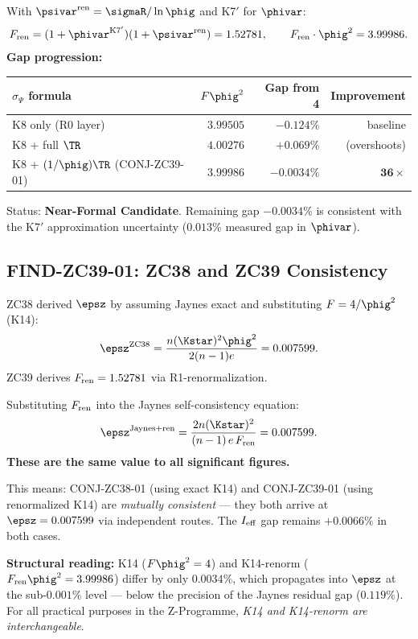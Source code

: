\documentclass[12pt, a4paper]{article}
\begin{document}
\begin{keybox}[title={K14 Near-Formal: $F\phig^2 = 3.99986$ (gap $-0.0034\%$)}]
With $\psivar^{\rm ren} = \sigmaR/\ln\phig$ and K7$'$ for $\phivar$:
\[
  F_{\rm ren} = (1+\phivar^{\rm K7'})(1+\psivar^{\rm ren})
  = 1.52781,
  \qquad
  F_{\rm ren}\cdot\phig^2 = 3.99986.
\]
\textbf{Gap progression:}
\begin{center}
\renewcommand{\arraystretch}{1.3}
\begin{tabular}{lrrr}
\toprule
$\sigma_\Psi$ formula & $F\phig^2$ & Gap from 4 & Improvement \\
\midrule
K8 only (R0 layer)       & $3.99505$ & $-0.124\%$ & baseline \\
K8 + full $\TR$          & $4.00276$ & $+0.069\%$ & (overshoots) \\
K8 + $(1/\phig)\TR$ (CONJ-ZC39-01) & $3.99986$ & $-0.0034\%$ & $\mathbf{36\times}$ \\
\bottomrule
\end{tabular}
\end{center}
Status: \textbf{Near-Formal Candidate}.
Remaining gap $-0.0034\%$ is consistent with the K7$'$ approximation
uncertainty ($0.013\%$ measured gap in $\phivar$).
\end{keybox}

\subsection{FIND-ZC39-01: ZC38 and ZC39 Consistency}
\label{sec:consistency}

\begin{derivedbox}[title={FIND-ZC39-01: Mutual Consistency of ZC38 and ZC39}]
\sloppy
ZC38 derived $\epsz$ by assuming Jaynes exact and substituting $F = 4/\phig^2$ (K14):
\[
  \epsz^{\rm ZC38} = \frac{n(\Kstar)^2\phig^2}{2(n-1)e} = 0.007599.
\]
ZC39 derives $F_{\rm ren} = 1.52781$ via R1-renormalization.

Substituting $F_{\rm ren}$ into the Jaynes self-consistency equation:
\[
  \epsz^{\rm Jaynes+ren} = \frac{2n(\Kstar)^2}{(n-1)\,e\,F_{\rm ren}}
  = 0.007599.
\]
\textbf{These are the same value to all significant figures.}

\medskip
This means: CONJ-ZC38-01 (using exact K14) and CONJ-ZC39-01
(using renormalized K14) are \emph{mutually consistent} ---
they both arrive at $\epsz = 0.007599$ via independent routes.
The $I_{\rm eff}$ gap remains $+0.0066\%$ in both cases.

\medskip
\textbf{Structural reading:}
K14 ($F\phig^2 = 4$) and K14-renorm ($F_{\rm ren}\phig^2 = 3.99986$)
differ by only $0.0034\%$, which propagates into $\epsz$ at
the sub-$0.001\%$ level --- below the precision of the Jaynes
residual gap ($0.119\%$).
For all practical purposes in the Z-Programme,
\emph{K14 and K14-renorm are interchangeable}.
\end{derivedbox}
\end{document}
